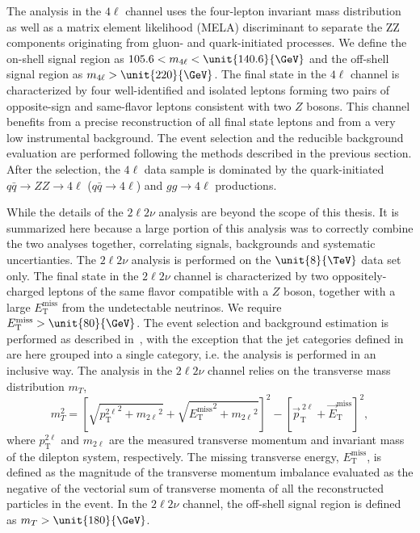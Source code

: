 The analysis in the $4\ell$ channel uses the four-lepton invariant mass distribution as well as a matrix element likelihood (MELA) discriminant to separate the ZZ components originating from gluon- and quark-initiated processes. We define the on-shell signal region as $105.6 < m_{4\ell} < \unit{140.6}{\GeV}$ and the off-shell signal region as  $m_{4\ell} > \unit{220}{\GeV}$. The final state in the $4\ell$ channel is characterized by four well-identified and isolated leptons
forming two pairs of opposite-sign and same-flavor leptons consistent with two $Z$ bosons.
This channel benefits from a precise reconstruction of all final state leptons and from a very low
instrumental background. The event selection and the reducible background evaluation are performed
following the methods described in the previous section.
After the selection, the $4\ell$ data sample is dominated by the quark-initiated
$q\bar{q} \to ZZ \to 4\ell$ ($q\bar{q} \to 4\ell$)
and $gg \to 4\ell$ productions.

While the details of the $2\ell2\nu$ analysis are beyond the scope of this thesis. It is summarized here because a large portion of this analysis was to correctly combine the two analyses together, correlating signals, backgrounds and systematic uncertianties. The $2\ell 2\nu$ analysis is performed on the $\unit{8}{\TeV}$ data set only. The final state in the $2\ell 2\nu$ channel is characterized by two oppositely-charged leptons of the same flavor
compatible with a $Z$ boson, together with a large $E_\mathrm{T}^\text{miss}$ from the undetectable neutrinos.
We require $E_\mathrm{T}^\text{miss} > \unit{80}{\GeV}$. The event selection and background estimation is performed as
described in~\cite{Chatrchyan:2013yoa}, with the exception that the jet categories defined
in \cite{Chatrchyan:2013yoa} are here grouped into a single category, i.e. the analysis
is performed in an inclusive way. The analysis in the $2\ell2\nu$ channel relies on the transverse mass distribution $m_{T}$,
\begin{equation}
m_{T}^{2} = \left[\sqrt{{p_{\mathrm{T}}^{2\ell}}^2 + {m_{2\ell}}^2} + \sqrt{{E_\mathrm{T}^\text{miss}}^2 +
{m_{2\ell}}^2}\right]^2 - \left[\vec{p}_{\mathrm{T}}^{~2\ell} + \vec{E}_\mathrm{T}^\text{miss}\right]^2 ,
\end{equation}
where $p_{\mathrm{T}}^{2\ell}$ and $m_{2\ell}$ are the measured transverse momentum and invariant mass
of the dilepton system, respectively. The missing transverse energy, $E_\mathrm{T}^\text{miss}$, is defined as
the magnitude of the transverse momentum imbalance evaluated as the negative of the vectorial sum of
transverse momenta of all the reconstructed particles in the event. In the $2\ell 2\nu$ channel,
the off-shell signal region is defined as $m_{T} > \unit{180}{\GeV}$.


